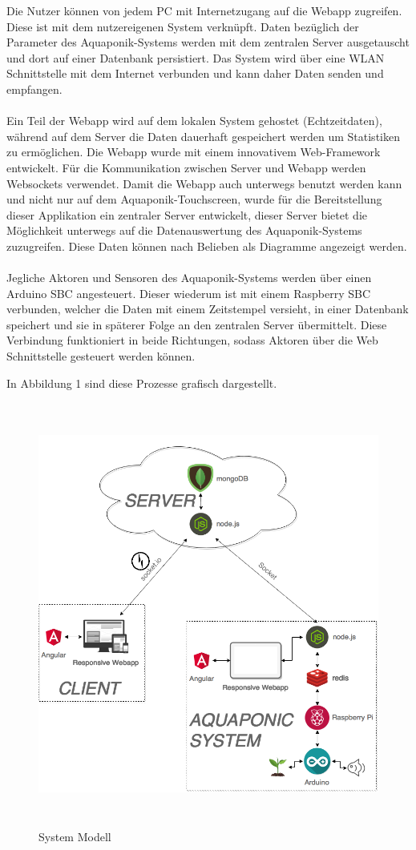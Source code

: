 Die Nutzer können von jedem \gls{PC} mit Internetzugang auf die \gls{Webapp} zugreifen. Diese ist mit dem nutzereigenen System verknüpft. Daten bezüglich der Parameter des Aquaponik-Systems werden mit dem zentralen Server ausgetauscht und dort auf einer Datenbank persistiert. Das System wird über eine \gls{WLAN} Schnittstelle mit dem Internet verbunden und kann daher Daten senden und empfangen.\\  \\
Ein Teil der \gls{Webapp} wird auf dem lokalen System gehostet (Echtzeitdaten), während auf dem Server die Daten dauerhaft gespeichert werden um Statistiken zu ermöglichen. Die \gls{Webapp} wurde mit einem innovativem Web-Framework entwickelt. Für die Kommunikation zwischen Server und Webapp werden Websockets verwendet. Damit die \gls{Webapp} auch unterwegs benutzt werden kann und nicht nur auf dem Aquaponik-Touchscreen, wurde für die Bereitstellung dieser Applikation ein zentraler Server entwickelt, dieser Server bietet die Möglichkeit unterwegs auf die Datenauswertung des Aquaponik-Systems zuzugreifen. Diese Daten können nach Belieben als Diagramme angezeigt werden.\\  \\
Jegliche Aktoren und Sensoren des Aquaponik-Systems werden über einen Arduino \gls{SBC}  angesteuert. Dieser wiederum ist mit einem Raspberry \gls{SBC} verbunden, welcher die Daten mit einem Zeitstempel versieht, in einer Datenbank speichert und sie in späterer Folge an den zentralen Server übermittelt. Diese Verbindung funktioniert in beide Richtungen, sodass Aktoren über die Web Schnittstelle gesteuert werden können.

In Abbildung 1 sind diese Prozesse grafisch dargestellt.

\clearpage
\begin{figure}[ht]
    \centering
    \includegraphics[height=5.5in]{images/complete_system}
	\caption{System Modell}
\end{figure}